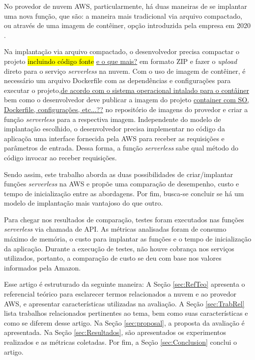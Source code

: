 \documentclass[conference]{IEEEtran}
\begin{document}
No provedor de nuvem AWS, particularmente, há duas maneiras de se implantar uma nova função, que são: a maneira mais tradicional via arquivo compactado, ou através de uma imagem de contêiner, opção introduzida pela empresa em 2020 \cite{aws_2020_supports_container_image}.

Na implantação via arquivo compactado, o desenvolvedor precisa compactar o projeto \hl{incluindo código fonte} \ul{e o que mais?} em formato ZIP e fazer o \textit{upload} direto para o serviço \textit{serverless} na nuvem. Com o uso de imagem de contêiner, é necessário um arquivo Dockerfile com as dependências e configurações para executar o projeto,\ul{de acordo com o sistema operacional intalado para o contâiner} bem como o desenvolvedor deve publicar a imagem do projeto \ul{container com SO, Dockerfile, configurações, etc...??} no repositório de imagens do provedor e criar a função \textit{serverless} para a respectiva imagem. 
Independente do modelo de implantação escolhido, o desenvolvedor precisa implementar no código da aplicaçõa uma interface fornecida pela AWS para receber as requisições e parâmetros de entrada. Dessa forma, a função \textit{serverless} sabe qual método do código invocar ao receber requisições.

Sendo assim, este trabalho aborda as duas possibilidades de criar/implantar funções \textit{serverless} na AWS e propõe uma comparação de desempenho, custo e tempo de inicialização entre as abordagens. Por fim, busca-se concluir se há um modelo de implantação mais vantajoso do que outro.

Para chegar nos resultados de comparação, testes foram executados nas funções \textit{serverless} via chamada de API. As métricas analisadas foram de consumo máximo de memória, o custo para implantar as funções e o tempo de inicialização da aplicação. Durante a execução de testes, não houve cobrança nos serviços utilizados, portanto, a comparação de custo se deu com base nos valores informados pela Amazon.

Esse artigo é estruturado da seguinte maneira: A Seção \ref{sec:RefTeo} apresenta o referencial teórico para esclarecer termos relacionados a nuvem e ao provedor AWS, e apresentar características utilizadas na avaliação. A Seção \ref{sec:TrabRel} lista trabalhos relacionados pertinentes ao tema, bem como suas características e como se diferem desse artigo. Na Seção \ref{sec:proposal}, a proposta da avaliação é apresentada. Na Seção \ref{sec:Resultados}, são apresentados os experimentos realizados e as métricas coletadas. Por fim, a Seção \ref{sec:Conclusion} conclui o artigo.
\end{document}
